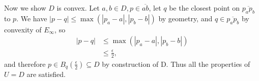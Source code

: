 Now we show \(D\) is convex. Let \(a, b \in D, p \in \overline{ab}\), let \(q\) be the closest point on \(\overline{p_ap_b}\) to \(p\). We have \(|p-q| \leq \max(|p_a - a|, |p_b - b|)\) by geometry, and \(q \in \overline{p_ap_b}\) by convexity of \(E_\infty\), so
\begin{align*}
    |p-q| &\leq \max(|p_a - a|, |p_b - b|) \\
    &\leq \frac{\epsilon}{2},
\end{align*}
and therefore \(p \in B_q\left(\frac{\epsilon}{2}\right) \subseteq D\) by construction of D. 
Thus all the properties of \(U = D\) are satisfied.




